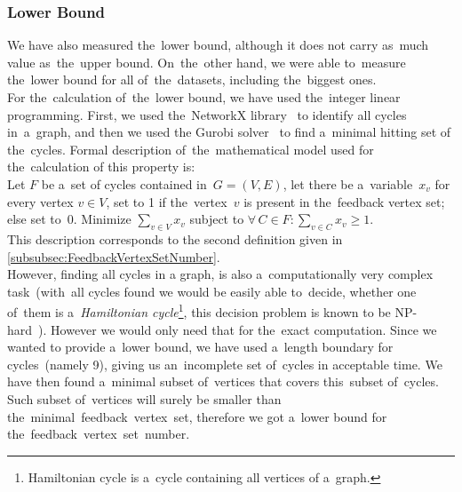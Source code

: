 \subsubsection{Lower Bound}
We have also measured the~lower bound, although it does not carry as~much value as~the~upper bound. On~the~other hand, we were able to~measure the~lower bound for all of~the~datasets, including the~biggest ones. \\
For the~calculation of~the~lower bound, we have used the~integer linear programming. First, we used the~NetworkX library~\cite{networkx} to identify all cycles in~a~graph, and then we used the Gurobi solver~\cite{gurobi} to find a~minimal hitting set of the~cycles. Formal description of~the~mathematical model used for the~calculation of this property is: \\
Let $F$ be a~set of cycles contained in~$G = (V, E)$, let there be a~variable~$x_v$ for every vertex $v \in V$, set to 1 if the~vertex~$v$ is present in the~feedback vertex set; else set to~0. Minimize $\sum_{v \in V} x_v$ subject to $\forall\,C \in F:\sum_{v \in C} x_v \geq 1$. \\
This description corresponds to the second definition given in \autoref{subsubsec:FeedbackVertexSetNumber}. \\
However, finding all cycles in a graph, is also a~computationally very complex task~(with~all cycles found we would be easily able to~decide, whether one of~them is a~\textit{Hamiltonian cycle}\footnote{Hamiltonian cycle is a~cycle containing all vertices of a~graph.}, this decision problem is known to be NP-hard~\cite{Karp}). However we would only need that for the~exact computation. Since we wanted to provide a~lower bound, we have used a~length boundary for cycles~(namely 9), giving us an~incomplete set of~cycles in acceptable time. We have then found a~minimal subset of~vertices that covers this~subset of~cycles. Such subset of~vertices will surely be smaller than the~minimal~feedback~vertex~set, therefore we got a~lower bound for the~feedback~vertex~set~number.
